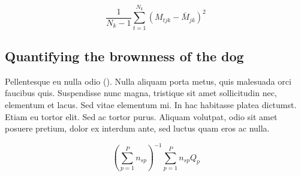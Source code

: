 \documentclass[11pt]{article}
\begin{document}
\begin{equation}
{ \frac{1}{N_k-1} \sum \limits_{t=1}^{N_k} (M_{tjk} - \bar{M}_{jk})^2}
\end{equation}

\subsection*{Quantifying the brownness of the dog}

Pellentesque eu nulla odio (\citealt{Xiao2015,CookEtAl2015}). Nulla 
aliquam porta metus, quis malesuada orci faucibus quis. Suspendisse nunc 
magna, tristique sit amet sollicitudin nec, elementum et lacus. Sed 
vitae elementum mi. In hac habitasse platea dictumst. Etiam eu tortor 
elit. Sed ac tortor purus. Aliquam volutpat, odio sit amet posuere 
pretium, dolor ex interdum ante, sed luctus quam eros ac nulla. 

\begin{equation}
{ (\sum \limits_{p=1}^P {n_{sp}})^{-1}\sum \limits_{p=1}^P {n_{sp}Q_{p}}}
\end{equation}

\newpage{}








\end{document}
